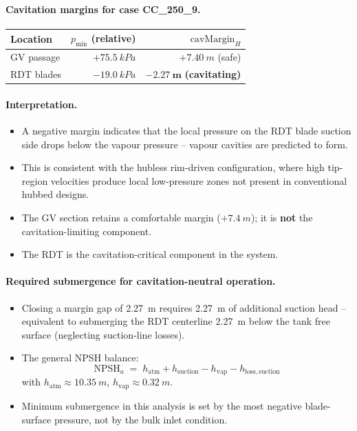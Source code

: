 \paragraph{Cavitation margins for case CC\_250\_9.}
\begin{table}[h]
\centering
\begin{tabular}{lrr}
\hline
Location & $p_\mathrm{min}$ (relative) & $\mathrm{cavMargin}_H$ \\
\hline
GV passage & $+\SI{75.5}{kPa}$ & $+\SI{7.40}{m}$ (safe) \\
RDT blades & $-\SI{19.0}{kPa}$ & $\boldsymbol{-\SI{2.27}{m}}$ \textbf{(cavitating)} \\
\hline
\end{tabular}
\end{table}

\paragraph{Interpretation.}
\begin{itemize}
    \item A negative margin indicates that the local pressure on the RDT blade suction side drops below the vapour pressure -- vapour cavities are predicted to form.
    \item This is consistent with the hubless rim-driven configuration, where high tip-region velocities produce local low-pressure zones not present in conventional hubbed designs.
    \item The GV section retains a comfortable margin ($+\SI{7.4}{m}$); it is \textbf{not} the cavitation-limiting component.
    \item The RDT is the cavitation-critical component in the system.
\end{itemize}

\paragraph{Required submergence for cavitation-neutral operation.}
\begin{itemize}
    \item Closing a margin gap of \SI{2.27}{m} requires \SI{2.27}{m} of additional suction head -- equivalent to submerging the RDT centerline \SI{2.27}{m} below the tank free surface (neglecting suction-line losses).
    \item The general NPSH balance:
    \begin{equation}
        \mathrm{NPSH}_a \;=\; h_\mathrm{atm} + h_\mathrm{suction} - h_\mathrm{vap} - h_\mathrm{loss,suction}
        \label{eq:npsh}
    \end{equation}
    with $h_\mathrm{atm} \approx \SI{10.35}{m}$, $h_\mathrm{vap} \approx \SI{0.32}{m}$.
    \item Minimum submergence in this analysis is set by the most negative blade-surface pressure, not by the bulk inlet condition.
\end{itemize}

